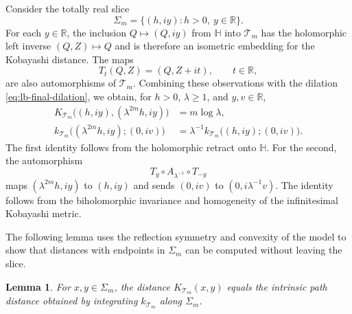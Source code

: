 \documentclass[11pt]{article}
\newtheorem{lemma}[theorem]{Lemma}
\theoremstyle{definition}
\begin{document}
Consider the totally real slice
\[
 \Sigma_m=\{(h,iy):h>0,\ y\in\mathbb R\}.
\]
For each $y\in\mathbb R$, the inclusion
$Q\mapsto(Q,iy)$ from $\mathbb H$ into $\mathcal T_m$ has the holomorphic
left inverse $(Q,Z)\mapsto Q$ and is therefore an isometric embedding for the
Kobayashi distance. The maps
\[
 T_t(Q,Z)=(Q,Z+it),
 \qquad t\in\mathbb R,
\]
are also automorphisms of $\mathcal T_m$. Combining these observations with
the dilation \eqref{eq:lb-final-dilation}, we obtain, for $h>0$,
$\lambda\geq1$, and $y,v\in\mathbb R$,
\begin{equation}\label{eq:lb-final-scale}
 \begin{aligned}
 K_{\mathcal T_m}\bigl((h,iy),(\lambda^{2m}h,iy)\bigr)
   &=m\log\lambda,\\
 k_{\mathcal T_m}\bigl((\lambda^{2m}h,iy);(0,iv)\bigr)
   &=\lambda^{-1}k_{\mathcal T_m}\bigl((h,iy);(0,iv)\bigr).
 \end{aligned}
\end{equation}
The first identity follows from the holomorphic retract onto $\mathbb H$. For
the second, the automorphism
\[
 T_y\circ A_{\lambda^{-1}}\circ T_{-y}
\]
maps $(\lambda^{2m}h,iy)$ to $(h,iy)$ and sends $(0,iv)$ to
$(0,i\lambda^{-1}v)$. The identity follows from the biholomorphic invariance
and homogeneity of the infinitesimal Kobayashi metric.

The following lemma uses the reflection symmetry and convexity of the model
to show that distances with endpoints in $\Sigma_m$ can be computed without
leaving the slice.

\begin{lemma}\label{lem:lb-final-slice}
For $x,y\in\Sigma_m$, the distance $K_{\mathcal T_m}(x,y)$ equals the
intrinsic path distance obtained by integrating $k_{\mathcal T_m}$ along
$\Sigma_m$.
\end{lemma}
\end{document}

